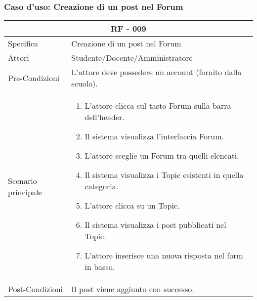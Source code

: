 \documentclass{article}
\begin{document}
\subsubsection{\textbf{Caso d'uso: Creazione di un post nel Forum}}
\begin{tabular}{ |p{3cm}|p{9cm}|  }
	\hline
	\multicolumn{2}{|c|}{\textbf{RF - 009}} \\
	\hline
	Specifica& Creazione di un post nel Forum\\
	\hline
	Attori& Studente/Docente/Amministratore\\
	\hline
	Pre-Condizioni& L'attore deve possedere un account (fornito dalla scuola).\\
	\hline
	Scenario principale& \begin{enumerate}
		\item L'attore clicca sul tasto Forum sulla barra dell'header.
		\item Il sistema visualizza l'interfaccia Forum.
		\item L'attore sceglie un Forum tra quelli elencati.
		\item Il sistema visualizza i Topic esistenti in quella categoria.
		\item L'attore clicca su un Topic.
		\item Il sistema visualizza i post pubblicati nel Topic.
		\item L'attore inserisce una nuova risposta nel form in basso.
	\end{enumerate}\\
	\hline
	Post-Condizioni& Il post viene aggiunto con successo.\\
	\hline
\end{tabular}
\normalsize
\flushleft
\vspace{4mm} 
\end{document}
